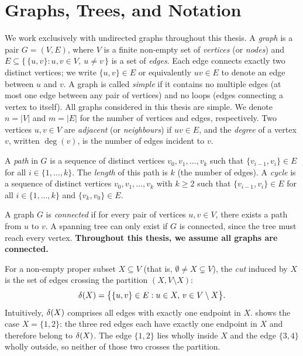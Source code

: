 \section{Graphs, Trees, and Notation}\label{sec:graph-notation}

We work exclusively with undirected graphs throughout this thesis.
A \emph{\textcolor{RWTHBlue}{graph}} is a pair $G = (V, E)$, where $V$ is a finite non-empty set of \emph{vertices} (or \emph{nodes}) and $E \subseteq \{\, \{u, v\} : u, v \in V,\ u \neq v \,\}$ is a set of \emph{edges}.
Each edge connects exactly two distinct vertices; we write $\{u, v\} \in E$ or equivalently $uv \in E$ to denote an edge between $u$ and $v$.
A graph is called \emph{\textcolor{RWTHBlue}{simple}} if it contains no multiple edges (at most one edge between any pair of vertices) and no loops (edges connecting a vertex to itself).
All graphs considered in this thesis are simple.
We denote $n = |V|$ and $m = |E|$ for the number of vertices and edges, respectively.
Two vertices $u, v \in V$ are \emph{adjacent} (or \emph{neighbours}) if $uv \in E$, and the \emph{degree} of a vertex $v$, written $\deg(v)$, is the number of edges incident to $v$.

A \emph{\textcolor{RWTHBlue}{path}} in $G$ is a sequence of distinct vertices $v_0, v_1, \ldots, v_k$ such that $\{v_{i-1}, v_i\} \in E$ for all $i \in \{1, \ldots, k\}$.
The \emph{length} of this path is $k$ (the number of edges).
A \emph{\textcolor{RWTHBlue}{cycle}} is a sequence of distinct vertices $v_0, v_1, \ldots, v_k$ with $k \geq 2$ such that $\{v_{i-1}, v_i\} \in E$ for all $i \in \{1, \ldots, k\}$ and $\{v_k, v_0\} \in E$.

A graph $G$ is \emph{\textcolor{RWTHBlue}{connected}} if for every pair of vertices $u, v \in V$, there exists a path from $u$ to $v$.
A spanning tree can only exist if $G$ is connected, since the tree must reach every vertex.
\textcolor{RWTHOrange}{\textbf{Throughout this thesis, we assume all graphs are connected.}}

For a non-empty proper subset $X \subseteq V$ (that is, $\emptyset \neq X \subsetneq V$), the \emph{\textcolor{RWTHBlue}{cut}} induced by $X$ is the set of edges crossing the partition $(X, V \setminus X)$:
\[
\delta(X) = \bigl\{ \{u, v\} \in E : u \in X,\, v \in V \setminus X \bigr\}.
\]
Intuitively, $\delta(X)$ comprises all edges with exactly one endpoint in $X$.
 shows the case $X = \{1, 2\}$: the three red edges each have exactly one endpoint in $X$ and therefore belong to $\delta(X)$. The edge $\{1, 2\}$ lies wholly inside $X$ and the edge $\{3, 4\}$ wholly outside, so neither of those two crosses the partition.

